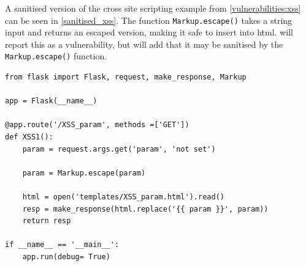 A sanitised version of the cross site scripting example from \cref{vulnerabilities:xss} can be seen in \cref{sanitised_xss}.
The function \texttt{Markup.escape()} takes a string input and returns an escaped version, making it safe to insert into html.
\pyt will report this as a vulnerability, but will add that it may be sanitised by the \texttt{Markup.escape()} function.

\begin{minipage}{\linewidth}
\begin{lstlisting}[style=python, caption={The cross site scripting example sanitised by the escape function}, label={sanitised_xss}]
from flask import Flask, request, make_response, Markup

app = Flask(__name__)

@app.route('/XSS_param', methods =['GET'])
def XSS1():
    param = request.args.get('param', 'not set')

    param = Markup.escape(param)

    html = open('templates/XSS_param.html').read()
    resp = make_response(html.replace('{{ param }}', param))
    return resp

if __name__ == '__main__':
    app.run(debug= True)  
\end{lstlisting}
\end{minipage}
